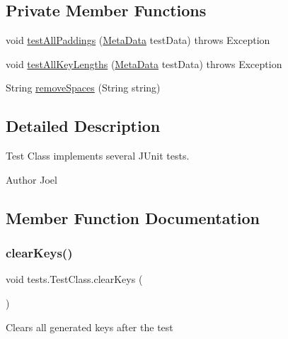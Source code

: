 \subsection*{Private Member Functions}
\begin{DoxyCompactItemize}
\item 
void \mbox{\hyperlink{classtests_1_1_test_class_ad9f19e80ff161cfedfbfe4ba527c0074}{test\+All\+Paddings}} (\mbox{\hyperlink{classpersistence_1_1_meta_data}{Meta\+Data}} test\+Data)  throws Exception     
\item 
void \mbox{\hyperlink{classtests_1_1_test_class_a8bf4e8d943fa1d61fbaa615dcefeca69}{test\+All\+Key\+Lengths}} (\mbox{\hyperlink{classpersistence_1_1_meta_data}{Meta\+Data}} test\+Data)  throws Exception     
\item 
String \mbox{\hyperlink{classtests_1_1_test_class_aec33554fa3042880887c06901cf1f4cd}{remove\+Spaces}} (String string)
\end{DoxyCompactItemize}


\subsection{Detailed Description}
Test Class implements several J\+Unit tests. \begin{DoxyAuthor}{Author}
Joel 
\end{DoxyAuthor}


\subsection{Member Function Documentation}
\mbox{\label{classtests_1_1_test_class_a76d4a21196ec5031baa7c7a42be58cb5}} 
\subsubsection{\texorpdfstring{clear\+Keys()}{clearKeys()}}
{\footnotesize\ttfamily void tests.\+Test\+Class.\+clear\+Keys (\begin{DoxyParamCaption}{ }\end{DoxyParamCaption})}

Clears all generated keys after the test \mbox{\label{classtests_1_1_test_class_aec33554fa3042880887c06901cf1f4cd}} 

